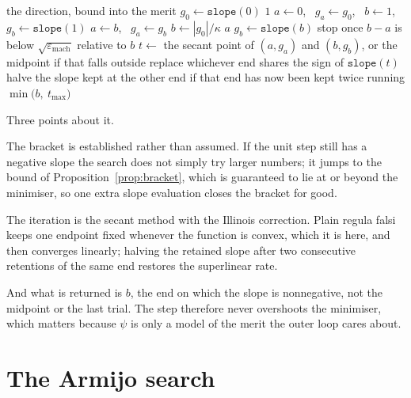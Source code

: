\documentclass[a4paper,11pt]{book}
\theoremstyle{plain}
\theoremstyle{definition}
\theoremstyle{remark}
\numberwithin{equation}{chapter}
\numberwithin{algorithm}{chapter}
\begin{document}
	\begin{algorithm}[H]
		\caption{\texttt{exact\_search}}
		\begin{algorithmic}[1]
			\Require the direction, bound into the merit
			\State $g_0\gets\texttt{slope}(0)$
			\State \Return $1$
			\EndIf
			\State $a\gets0$, \ $g_a\gets g_0$, \ $b\gets1$, \
			$g_b\gets\texttt{slope}(1)$
			\State $a\gets b$, \ $g_a\gets g_b$
			\State $b\gets|g_0|/\kappa$
			 \State \Return $a$ \EndIf
			\State $g_b\gets\texttt{slope}(b)$
			\EndIf
			\State stop once $b-a$ is below $\sqrt{\varepsilon_{\mathrm{mach}}}$
			relative to $b$
			\State $t\gets$ the secant point of $(a,g_a)$ and $(b,g_b)$, or the
			midpoint if that falls outside
			\State replace whichever end shares the sign of $\texttt{slope}(t)$
			\State halve the slope kept at the other end if that end has now been
			kept twice running
			\EndFor
			\EndIf
			\State \Return $\min\bigl(b,\ t_{\max}\bigr)$
		\end{algorithmic}
	\end{algorithm}

	Three points about it.

	The bracket is established rather than assumed. If the unit step still has a
	negative slope the search does not simply try larger numbers; it jumps to the
	bound of Proposition~\ref{prop:bracket}, which is guaranteed to lie at or
	beyond the minimiser, so one extra slope evaluation closes the bracket for
	good.

	The iteration is the secant method with the Illinois correction. Plain regula
	falsi keeps one endpoint fixed whenever the function is convex, which it is
	here, and then converges linearly; halving the retained slope after two
	consecutive retentions of the same end restores the superlinear rate.

	And what is returned is $b$, the end on which the slope is nonnegative, not
	the midpoint or the last trial. The step therefore never overshoots the
	minimiser, which matters because $\psi$ is only a model of the merit the outer
	loop cares about.

	\section{The Armijo search}
\end{document}
